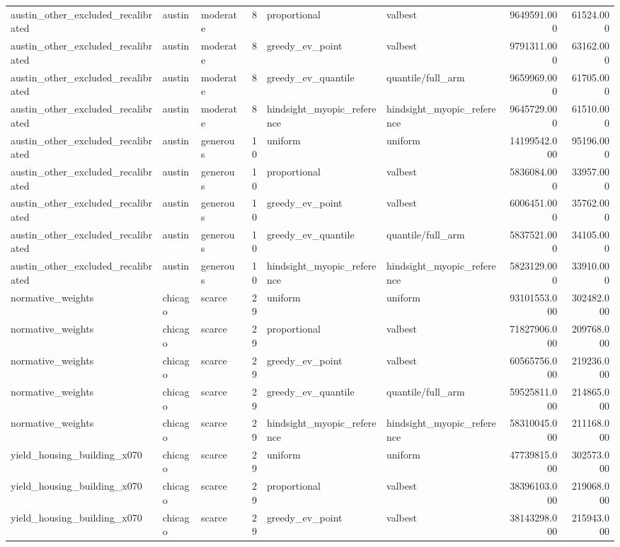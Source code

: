 \begin{tabular}{lllrllrr}
austin\_other\_excluded\_recalibrated & austin & moderate & 8 & proportional & valbest & 9649591.000 & 61524.000 \\
austin\_other\_excluded\_recalibrated & austin & moderate & 8 & greedy\_ev\_point & valbest & 9791311.000 & 63162.000 \\
austin\_other\_excluded\_recalibrated & austin & moderate & 8 & greedy\_ev\_quantile & quantile/full\_arm & 9659969.000 & 61705.000 \\
austin\_other\_excluded\_recalibrated & austin & moderate & 8 & hindsight\_myopic\_reference & hindsight\_myopic\_reference & 9645729.000 & 61510.000 \\
austin\_other\_excluded\_recalibrated & austin & generous & 10 & uniform & uniform & 14199542.000 & 95196.000 \\
austin\_other\_excluded\_recalibrated & austin & generous & 10 & proportional & valbest & 5836084.000 & 33957.000 \\
austin\_other\_excluded\_recalibrated & austin & generous & 10 & greedy\_ev\_point & valbest & 6006451.000 & 35762.000 \\
austin\_other\_excluded\_recalibrated & austin & generous & 10 & greedy\_ev\_quantile & quantile/full\_arm & 5837521.000 & 34105.000 \\
austin\_other\_excluded\_recalibrated & austin & generous & 10 & hindsight\_myopic\_reference & hindsight\_myopic\_reference & 5823129.000 & 33910.000 \\
normative\_weights & chicago & scarce & 29 & uniform & uniform & 93101553.000 & 302482.000 \\
normative\_weights & chicago & scarce & 29 & proportional & valbest & 71827906.000 & 209768.000 \\
normative\_weights & chicago & scarce & 29 & greedy\_ev\_point & valbest & 60565756.000 & 219236.000 \\
normative\_weights & chicago & scarce & 29 & greedy\_ev\_quantile & quantile/full\_arm & 59525811.000 & 214865.000 \\
normative\_weights & chicago & scarce & 29 & hindsight\_myopic\_reference & hindsight\_myopic\_reference & 58310045.000 & 211168.000 \\
yield\_housing\_building\_x070 & chicago & scarce & 29 & uniform & uniform & 47739815.000 & 302573.000 \\
yield\_housing\_building\_x070 & chicago & scarce & 29 & proportional & valbest & 38396103.000 & 219068.000 \\
yield\_housing\_building\_x070 & chicago & scarce & 29 & greedy\_ev\_point & valbest & 38143298.000 & 215943.000 \\

\end{tabular}
